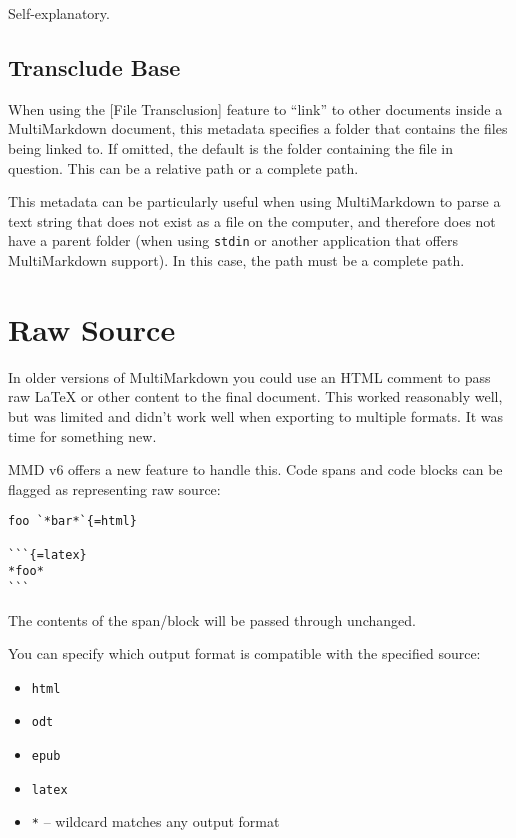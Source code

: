 Self-explanatory.

\subsection{Transclude Base }
\label{transcludebase}

When using the {[File Transclusion]} feature to ``link'' to other documents inside a MultiMarkdown document, this metadata specifies a folder that contains the files being linked to. If omitted, the default is the folder containing the file in question. This can be a relative path or a complete path.

This metadata can be particularly useful when using MultiMarkdown to parse a text string that does not exist as a file on the computer, and therefore does not have a parent folder (when using \texttt{stdin} or another application that offers MultiMarkdown support). In this case, the path must be a complete path.

\section{Raw Source }
\label{rawsource}

In older versions of MultiMarkdown you could use an HTML comment to pass raw LaTeX or other content to the final document. This worked reasonably well, but was limited and didn't work well when exporting to multiple formats. It was time for something new.

\gls{MMD} v6 offers a new feature to handle this. Code spans and code blocks can be flagged as representing raw source:

\begin{verbatim}
foo `*bar*`{=html}

```{=latex}
*foo*
```
\end{verbatim}

The contents of the span\slash block will be passed through unchanged.

You can specify which output format is compatible with the specified source:

\begin{itemize}
\item \texttt{html}

\item \texttt{odt}

\item \texttt{epub}

\item \texttt{latex}

\item \texttt{*} -- wildcard matches any output format

\end{itemize}

